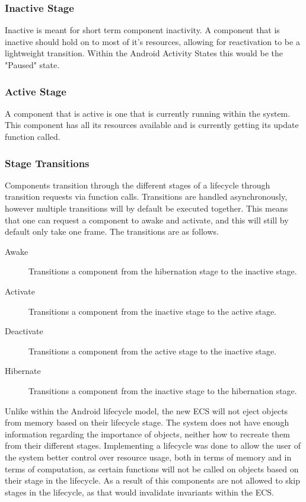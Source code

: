 \subsubsection{Inactive Stage}
Inactive is meant for short term component inactivity.
A component that is inactive should hold on to most of it's resources, allowing for reactivation to be a lightweight transition.
Within the Android Activity States this would be the "Paused" state\cite[Activity state and ejection from memory]{android_activity_lifecycle}.

\subsubsection{Active Stage}
A component that is active is one that is currently running within the system.
This component has all its resources available and is currently getting its update function called.

\subsubsection{Stage Transitions}
Components transition through the different stages of a lifecycle through transition requests via function calls.
Transitions are handled asynchronously, however multiple transitions will by default be executed together.
This means that one can request a component to awake and activate, and this will still by default only take one frame.
The transitions are as follows.
\begin{description}
    \item
    [Awake] Transitions a component from the hibernation stage to the inactive stage.

    \item
    [Activate] Transitions a component from the inactive stage to the active stage.

    \item
    [Deactivate] Transitions a component from the active stage to the inactive stage.

    \item
    [Hibernate] Transitions a component from the inactive stage to the hibernation stage.
\end{description}

Unlike within the Android lifecycle model, the new ECS will not eject objects from memory based on their lifecycle stage\cite[Activity state and ejection from memory]{android_activity_lifecycle}.
The system does not have enough information regarding the importance of objects, neither how to recreate them from their different stages.
Implementing a lifecycle was done to allow the user of the system better control over resource usage, both in terms of memory
and in terms of computation, as certain functions will not be called on objects based on their stage in the lifecycle.
As a result of this components are not allowed to skip stages in the lifecycle, as that would invalidate invariants within the ECS.
